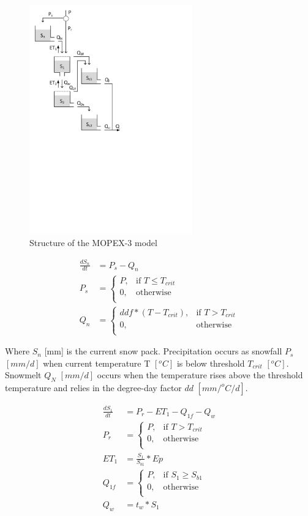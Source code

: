 { 																	%
\begin{figure}
\includegraphics[trim=1cm 13cm 7cm 1cm,width=7cm,keepaspectratio]{./files/31_schematic.pdf}
\caption{Structure of the MOPEX-3 model} \label{fig:31_schematic}
\end{figure}

\begin{align}
	\frac{dS_n}{dt} &= P_s-Q_{n} \\
	P_s &= \begin{cases}
		P, &\text{if } T \leq T_{crit} \\
		0, & \text{otherwise} \\
	\end{cases} \\
	Q_n &=\begin{cases}
		ddf*(T-T_{crit}), &\text{if } T > T_{crit} \\
		0, & \text{otherwise} \\
	\end{cases}
\end{align}

Where $S_n$ [mm] is the current snow pack. Precipitation occurs as snowfall $P_s$ $[mm/d]$ when current temperature T $[^oC]$ is below threshold $T_{crit}$ $[^oC]$. Snowmelt $Q_N$ $[mm/d]$ occurs when the temperature rises above the threshold temperature and relies in the degree-day factor $dd$ $[mm/^oC/d]$.

\begin{align}
	\frac{dS_1}{dt} &= P_r-ET_1-Q_{1f}-Q_w \\
	P_r &= \begin{cases}
		P, &\text{if } T > T_{crit} \\
		0, & \text{otherwise} \\
	\end{cases} \\
	ET_1 &= \frac{S_1}{S_{b1}}*Ep\\
	Q_{1f} &= \begin{cases}
		P, &\text{if } S_1 \geq S_{b1} \\
		0, & \text{otherwise} \\
	\end{cases} \\
	Q_w &= t_w*S_1
\end{align}

}
